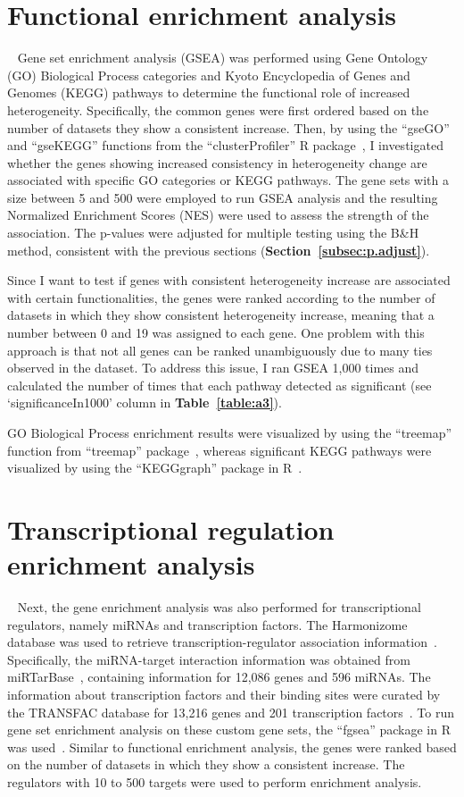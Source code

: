 \section{Functional enrichment analysis}~\label{sec:func}
Gene set enrichment analysis (GSEA) was performed using Gene Ontology (GO) Biological Process categories and Kyoto Encyclopedia of Genes and Genomes (KEGG) pathways 
to determine the functional role of increased heterogeneity.
Specifically, the common genes were first ordered based on the number of datasets they show a consistent increase.
Then, by using the ``gseGO'' and ``gseKEGG'' functions from the ``clusterProfiler'' R package~\autocite{clusterProfiler}, 
I investigated whether the genes showing increased consistency in heterogeneity change are associated with specific GO categories or KEGG pathways.
The gene sets with a size between 5 and 500 were employed to run GSEA analysis and the resulting Normalized Enrichment Scores (NES) were used to assess the strength of the association.
The p-values were adjusted for multiple testing using the B{\&}H method, consistent with the previous sections (\textbf{Section~\ref{subsec:p.adjust}}).

Since I want to test if genes with consistent heterogeneity increase are associated with certain functionalities, 
the genes were ranked according to the number of datasets in which they show consistent heterogeneity increase, meaning that a number between 0 and 19 was assigned to each gene.
One problem with this approach is that not all genes can be ranked unambiguously due to many ties observed in the dataset. 
To address this issue, I ran GSEA 1,000 times and calculated the number of times that each pathway detected as significant (see `significanceIn1000' column in \textbf{Table~\ref{table:a3}}).

GO Biological Process enrichment results were visualized by using the ``treemap'' function from ``treemap'' package~\autocite{treemap2021}, 
whereas significant KEGG pathways were visualized by using the ``KEGGgraph'' package in R~\autocite{KEGGgraph}.

\section{Transcriptional regulation enrichment analysis}~\label{sec:reg.enrich}
Next, the gene enrichment analysis was also performed for transcriptional regulators, namely miRNAs and transcription factors. 
The Harmonizome database was used to retrieve transcription-regulator association information~\autocite{Rouillard2016}.
Specifically, the miRNA-target interaction information was obtained from miRTarBase~\autocite{Chou2016}, containing information for 12,086 genes and 596 miRNAs.
The information about transcription factors and their binding sites were curated by the TRANSFAC database for 13,216 genes and 201 transcription factors~\autocite{Matys2006}.
To run gene set enrichment analysis on these custom gene sets, the ``fgsea'' package in R was used~\autocite{fgsea}.
Similar to functional enrichment analysis, the genes were ranked based on the number of datasets in which they show a consistent increase.
The regulators with 10 to 500 targets were used to perform enrichment analysis.

